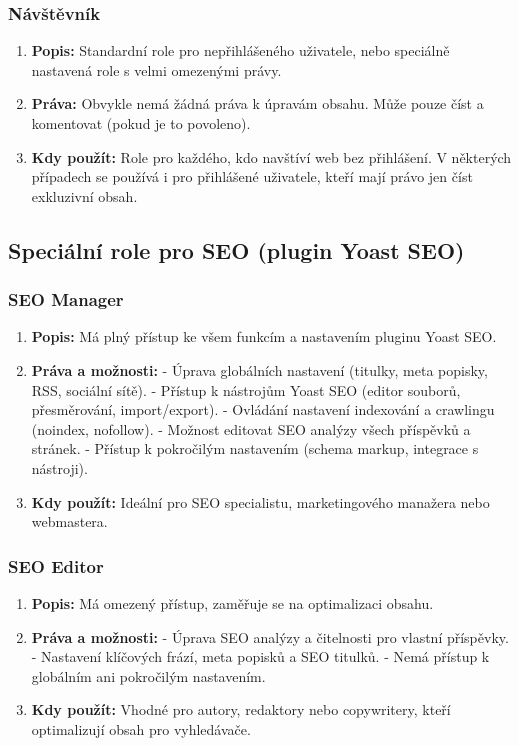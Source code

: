 \documentclass[12pt,a4paper]{article}
\begin{document}
	\subsubsection*{Návštěvník}
	\begin{enumerate}
	\item \textbf{Popis:} Standardní role pro nepřihlášeného uživatele, nebo speciálně nastavená role s velmi omezenými právy.
	\item \textbf{Práva:} Obvykle nemá žádná práva k úpravám obsahu. Může pouze číst a komentovat (pokud je to povoleno).
	\item \textbf{Kdy použít:} Role pro každého, kdo navštíví web bez přihlášení. V některých případech se používá i pro přihlášené uživatele, kteří mají právo jen číst exkluzivní obsah.
	\end{enumerate}
	
	\subsection*{Speciální role pro SEO (plugin Yoast SEO)}
	
	\subsubsection*{SEO Manager}
	\begin{enumerate}
	\item \textbf{Popis:} Má plný přístup ke všem funkcím a nastavením pluginu Yoast SEO.
	\item \textbf{Práva a možnosti:}  
	- Úprava globálních nastavení (titulky, meta popisky, RSS, sociální sítě).  
	- Přístup k nástrojům Yoast SEO (editor souborů, přesměrování, import/export).  
	- Ovládání nastavení indexování a crawlingu (noindex, nofollow).  
	- Možnost editovat SEO analýzy všech příspěvků a stránek.  
	- Přístup k pokročilým nastavením (schema markup, integrace s nástroji).
	\item \textbf{Kdy použít:} Ideální pro SEO specialistu, marketingového manažera nebo webmastera.
	\end{enumerate}
	
	\subsubsection*{SEO Editor}
	\begin{enumerate}
	\item \textbf{Popis:} Má omezený přístup, zaměřuje se na optimalizaci obsahu.
	\item \textbf{Práva a možnosti:}  
	- Úprava SEO analýzy a čitelnosti pro vlastní příspěvky.  
	- Nastavení klíčových frází, meta popisků a SEO titulků.  
	- Nemá přístup k globálním ani pokročilým nastavením.
	\item \textbf{Kdy použít:} Vhodné pro autory, redaktory nebo copywritery, kteří optimalizují obsah pro vyhledávače.
	\end{enumerate}
	
\end{document}
